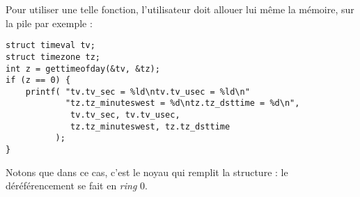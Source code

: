 Pour utiliser une telle fonction, l'utilisateur doit allouer lui même la
mémoire, sur la pile par exemple :

\begin{Verbatim}
struct timeval tv;
struct timezone tz;
int z = gettimeofday(&tv, &tz);
if (z == 0) {
    printf( "tv.tv_sec = %ld\ntv.tv_usec = %ld\n"
            "tz.tz_minuteswest = %d\ntz.tz_dsttime = %d\n",
             tv.tv_sec, tv.tv_usec,
             tz.tz_minuteswest, tz.tz_dsttime
          );
}
\end{Verbatim}

Notons que dans ce cas, c'est le noyau qui remplit la structure : le
déréférencement se fait en \emph{ring} 0.

